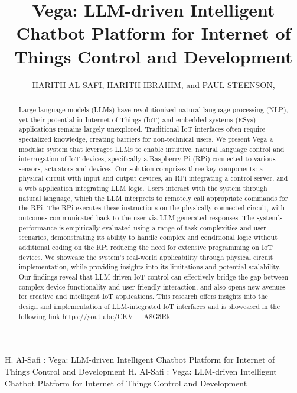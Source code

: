\documentclass{ieeeaccess}
\begin{document}

\title{Vega: LLM-driven Intelligent Chatbot Platform for Internet of Things Control and Development}
\author{\uppercase{Harith Al-Safi},
    \uppercase{Harith Ibrahim}, and {\uppercase{Paul Steenson},
    }}

\address{School of Electronics and Electrical Engineering, University of Leeds,
    Leeds LS2 9JT, U.K}

\markboth
{H. Al-Safi \headeretal: Vega: LLM-driven Intelligent Chatbot Platform for Internet of Things Control and Development}
{H. Al-Safi \headeretal: Vega: LLM-driven Intelligent Chatbot Platform for Internet of Things Control and Development}


\begin{abstract}
    Large language models (LLMs) have revolutionized natural language processing (NLP), yet their potential in Internet of Things (IoT) and embedded systems (ESys) applications remains largely unexplored. Traditional IoT interfaces often require specialized knowledge, creating barriers for non-technical users. We present Vega a modular system that leverages LLMs to enable intuitive, natural language control and interrogation of IoT devices, specifically a Raspberry Pi (RPi) connected to various sensors, actuators and devices. Our solution comprises three key components: a physical circuit with input and output devices, an RPi integrating a control server, and a web application integrating LLM logic. Users interact with the system through natural language, which the LLM interprets to remotely call appropriate commands for the RPi. The RPi executes these instructions on the physically connected circuit, with outcomes communicated back to the user via LLM-generated responses. The system's performance is empirically evaluated using a range of task complexities and user scenarios, demonstrating its ability to handle complex and conditional logic without additional coding on the RPi reducing the need for extensive programming on IoT devices. We showcase the system's real-world applicability through physical circuit implementation, while providing insights into its limitations and potential scalability. Our findings reveal that LLM-driven IoT control can effectively bridge the gap between complex device functionality and user-friendly interaction, and also opens new avenues for creative and intelligent IoT applications. This research offers insights into the design and implementation of LLM-integrated IoT interfaces and is showcased in the following link \url{https://youtu.be/CKV\_\_A8G5Rk}
\end{abstract}
\end{document}
